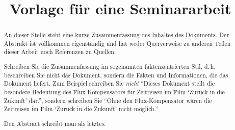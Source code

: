 \documentclass[conference,compsoc,final,a4paper]{IEEEtran}
\newcommand{\autoren}[0]{NACHNAME, VORNAME}
\newcommand{\dokumententitel}[0]{Vorlage für eine Seminararbeit}
\begin{document}
\title{\dokumententitel}

\author{
  \IEEEauthorblockN{\autoren}
}

\maketitle
\thispagestyle{plain}
\pagestyle{plain}


\begin{abstract}
An dieser Stelle steht eine kurze Zusammenfassung des Inhaltes des Dokuments. Der Abstrakt ist vollkommen eigenständig und hat weder Querverweise zu anderen Teilen dieser Arbeit noch Referenzen zu Quellen.

Schreiben Sie die Zusammenfassung im sogenannten faktenzentrierten Stil, d.\,h. beschreiben Sie nicht das Dokument, sondern die Fakten und Informationen, die das Dokument liefert. Zum Beispiel schreiben Sie \textit{nicht} \enquote{Dieses Dokument stellt die besondere Bedeutung des Flux-Kompensators für Zeitreisen im Film \enquote{Zurück in die Zukunft} dar.}, sondern schreiben Sie \enquote{Ohne den Flux-Kompensator wären die Zeitreisen im Film \enquote{Zurück in die Zukunft} nicht möglich.}

Den Abstract schreibt man als letztes.
\end{abstract}

{\small\tableofcontents}

\end{document}
